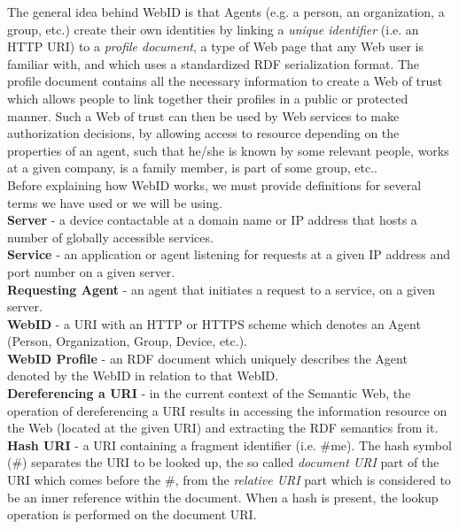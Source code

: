 The general idea behind WebID is that Agents (e.g. a person, an organization, a group, etc.) create their own identities by linking a \textit{unique identifier} (i.e. an HTTP URI) to a \textit{profile document}, a type of Web page that any Web user is familiar with, and which uses a standardized RDF serialization format. The profile document contains all the necessary information to create a Web of trust which allows people to link together their profiles in a public or protected manner. Such a Web of trust can then be used by Web services to make authorization decisions, by allowing access to resource depending on the properties of an agent, such that he/she is known by some relevant people, works at a given company, is a family member, is part of some group, etc..\\

Before explaining how WebID works, we must provide definitions for several terms we have used or we will be using.\\

\textbf{Server} - a device contactable at a domain name or IP address that hosts a number of globally accessible services.\\

\textbf{Service} - an application or agent listening for requests at a given IP address and port number on a given server.\\

\textbf{Requesting Agent} - an agent that initiates a request to a service, on a given server.\\

\textbf{WebID} - a URI with an HTTP or HTTPS scheme which denotes an Agent (Person, Organization, Group, Device, etc.).\\

\textbf{WebID Profile} - an RDF document which uniquely describes the Agent denoted by the WebID in relation to that WebID.\\

\textbf{Dereferencing a URI} - in the current context of the Semantic Web, the operation of dereferencing a URI results in accessing the information resource on the Web (located at the given URI) and extracting the RDF semantics from it.\\

\textbf{Hash URI} - a URI containing a fragment identifier (i.e. \#me). The hash symbol (\#) separates the URI to be looked up, the so called \textit{document URI} part of the URI which comes before the \#, from the \textit{relative URI} part which is considered to be an inner reference within the document. When a hash is present, the lookup operation is performed on the document URI.\\


